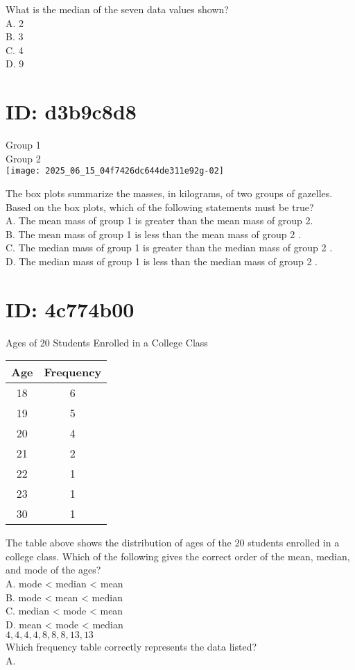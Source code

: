 

What is the median of the seven data values shown?\\
A. 2\\
B. 3\\
C. 4\\
D. 9

\section*{ID: d3b9c8d8}
Group 1\\
Group 2\\
\texttt{[image: 2025\_06\_15\_04f7426dc644de311e92g-02]}

The box plots summarize the masses, in kilograms, of two groups of gazelles. Based on the box plots, which of the following statements must be true?\\
A. The mean mass of group 1 is greater than the mean mass of group 2.\\
B. The mean mass of group 1 is less than the mean mass of group 2 .\\
C. The median mass of group 1 is greater than the median mass of group 2 .\\
D. The median mass of group 1 is less than the median mass of group 2 .

\section*{ID: 4c774b00}
Ages of 20 Students Enrolled in a College Class

\begin{center}
\begin{tabular}{|c|c|}
\hline
Age & Frequency \\
\hline
18 & 6 \\
\hline
19 & 5 \\
\hline
20 & 4 \\
\hline
21 & 2 \\
\hline
22 & 1 \\
\hline
23 & 1 \\
\hline
30 & 1 \\
\hline
\end{tabular}
\end{center}

The table above shows the distribution of ages of the 20 students enrolled in a college class. Which of the following gives the correct order of the mean, median, and mode of the ages?\\
A. mode < median < mean\\
B. mode < mean < median\\
C. median < mode < mean\\
D. mean < mode < median\\
$4,4,4,4,8,8,8,13,13$\\
Which frequency table correctly represents the data listed?\\
A.

